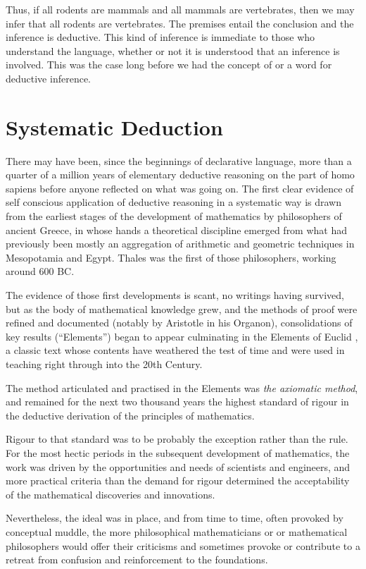 \documentclass[10pt,titlepage]{book}
\begin{document}
Thus, if all rodents are mammals and all mammals are vertebrates, then we may infer that all rodents are vertebrates.
The premises entail the conclusion and the inference is deductive.
This kind of inference is immediate to those who understand the language, whether or not it is understood that an inference is involved.
This was the case long before we had the concept of or a word for deductive inference.

\section{Systematic Deduction}

There may have been, since the beginnings of declarative language, more than a quarter of a million years of elementary deductive reasoning on the part of homo sapiens before anyone reflected on what was going on.
The first clear evidence of self conscious application of deductive reasoning in a systematic way is drawn from the earliest stages of the development of mathematics by philosophers of ancient Greece, in whose hands a theoretical discipline emerged from what had previously been mostly an aggregation of arithmetic and geometric techniques in Mesopotamia and Egypt.
Thales was the first of those philosophers, working around 600 BC.

The evidence of those first developments is scant, no writings having survived, but as the body of mathematical knowledge grew, and the methods of proof were refined and documented (notably by Aristotle in his Organon), consolidations of key results (``Elements'') began to appear culminating in the Elements of Euclid \cite{EuclidEL1}, a classic text whose contents have weathered the test of time and were used in teaching right through into the 20th Century.

The method articulated and practised in the Elements was \emph{the axiomatic method}, and remained for the next two thousand years the highest standard of rigour in the deductive derivation of the principles of mathematics.

Rigour to that standard was to be probably the exception rather than the rule.
For the most hectic periods in the subsequent development of mathematics, the work was driven by the opportunities and needs of scientists and engineers, and more practical criteria than the demand for rigour determined the acceptability of the mathematical discoveries and innovations.

Nevertheless, the ideal was in place, and from time to time, often provoked by conceptual muddle, the more philosophical mathematicians or or mathematical philosophers would offer their criticisms and sometimes provoke or contribute to a retreat from confusion and reinforcement to the foundations.
\end{document}
